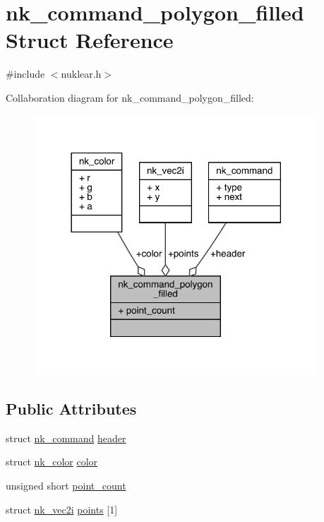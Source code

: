 \hypertarget{structnk__command__polygon__filled}{}\section{nk\+\_\+command\+\_\+polygon\+\_\+filled Struct Reference}
\label{structnk__command__polygon__filled}


{\ttfamily \#include $<$nuklear.\+h$>$}



Collaboration diagram for nk\+\_\+command\+\_\+polygon\+\_\+filled\+:
\nopagebreak
\begin{figure}[H]
\begin{center}
\leavevmode
\includegraphics[width=302pt]{structnk__command__polygon__filled__coll__graph}
\end{center}
\end{figure}
\subsection*{Public Attributes}
\begin{DoxyCompactItemize}
\item 
struct \mbox{\hyperlink{structnk__command}{nk\+\_\+command}} \mbox{\hyperlink{structnk__command__polygon__filled_af92b38523df52be6497c62b27887ce3f}{header}}
\item 
struct \mbox{\hyperlink{structnk__color}{nk\+\_\+color}} \mbox{\hyperlink{structnk__command__polygon__filled_aba8305ce94bcec6ef9800878279b426b}{color}}
\item 
unsigned short \mbox{\hyperlink{structnk__command__polygon__filled_a77c628f3053bba44270489623fafcc21}{point\+\_\+count}}
\item 
struct \mbox{\hyperlink{structnk__vec2i}{nk\+\_\+vec2i}} \mbox{\hyperlink{structnk__command__polygon__filled_a65b585227f390f0be21ce32828a09a99}{points}} \mbox{[}1\mbox{]}
\end{DoxyCompactItemize}


